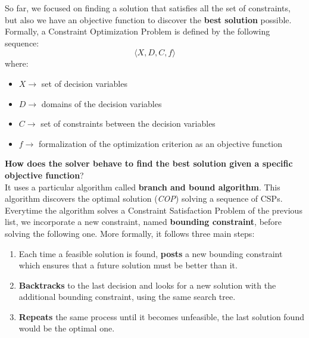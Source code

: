 So far, we focused on finding a solution that satisfies all the set of constraints, but also we have an objective function to discover the \textbf{best solution}
possible. Formally, a Constraint Optimization Problem is defined by the following sequence:
$$ \langle X, D, C, f \rangle $$
where:
\begin{itemize}
    \renewcommand{\labelitemi}{-}
    \item $X \rightarrow$ set of decision variables
    \item $D \rightarrow$ domains of the decision variables
    \item $C \rightarrow$ set of constraints between the decision variables
    \item $f \rightarrow$ formalization of the optimization criterion as an objective function
\end{itemize}
\textbf{How does the solver behave to find the best solution given a specific objective function}? \\
It uses a particular algorithm called \textbf{branch and bound algorithm}. This algorithm discovers the optimal solution (\textit{COP}) solving a sequence of
CSPs. Everytime the algorithm solves a Constraint Satisfaction Problem of the previous list, we incorporate a new constraint, named \textbf{bounding constraint},
before solving the following one. More formally, it follows three main steps:
\begin{enumerate}
    \item Each time a feasible solution is found, \textbf{posts} a new bounding constraint which ensures that a future solution must be better than it.
    \item \textbf{Backtracks} to the last decision and looks for a new solution with the additional bounding constraint, using the same search tree.
    \item \textbf{Repeats} the same process until it becomes unfeasible, the last solution found would be the optimal one.
\end{enumerate}
